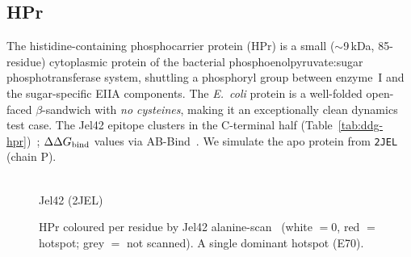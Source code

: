 \subsection{HPr}
The histidine-containing phosphocarrier protein (HPr) is a small ($\sim$9\,kDa, 85-residue)
cytoplasmic protein of the bacterial phosphoenolpyruvate:sugar phosphotransferase system,
shuttling a phosphoryl group between enzyme~I and the sugar-specific EIIA components. The
\textit{E.\ coli} protein is a well-folded open-faced $\beta$-sandwich with \emph{no cysteines},
making it an exceptionally clean dynamics test case. The Jel42 epitope clusters in the C-terminal
half (Table~\ref{tab:ddg-hpr})~\cite{prasad1998}; $\Delta\Delta G_{\mathrm{bind}}$ values via AB-Bind~\cite{sirin2016}. We
simulate the apo protein from \texttt{2JEL} (chain P).
\begin{figure}[H]\centering
\begin{minipage}[c]{0.6\linewidth}\centering{}\\[-2pt]{\small Jel42 (2JEL)}\end{minipage}\hfill
\begin{minipage}[c]{0.13\linewidth}\centering{}\end{minipage}
\caption{HPr coloured per residue by Jel42 alanine-scan \ddG\ (white $=0$, red $=$ hotspot; grey $=$ not scanned). A single dominant hotspot (E70).}\end{figure}


